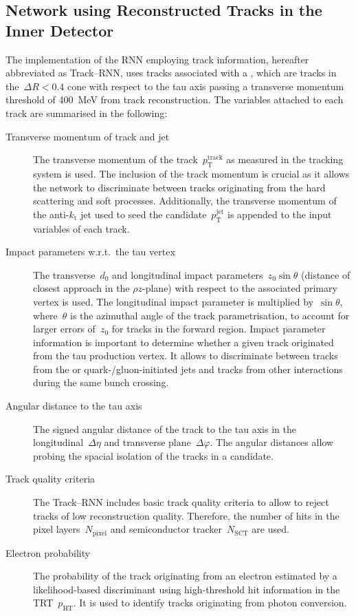 \subsection{Network using Reconstructed Tracks in the Inner Detector}
\label{sec:rnn_tracks}

The implementation of the RNN employing track information, hereafter abbreviated
as Track--RNN, uses tracks associated with a \tauhadvis, which are tracks in
the~$\Delta R < 0.4$ cone with respect to the tau axis passing a transverse
momentum threshold of \SI{400}{\MeV} from track reconstruction. The variables
attached to each track are summarised in the following:
\begin{description}
\item[Transverse momentum of track and jet] The transverse momentum of the
  track~$p_\text{T}^\text{track}$ as measured in the tracking system is used.
  The inclusion of the track momentum is crucial as it allows the network to
  discriminate between tracks originating from the hard scattering and soft
  processes. Additionally, the transverse momentum of the anti-$k_\text{t}$ jet
  used to seed the \tauhadvis candidate~$p_\text{T}^\text{jet}$ is appended to
  the input variables of each track.


\item[Impact parameters w.r.t.\ the tau vertex] The transverse~$d_0$ and
  longitudinal impact parameters~$z_0 \sin\theta$ (distance of closest approach
  in the $\rho z$-plane) with respect to the associated primary vertex is used.
  The longitudinal impact parameter is multiplied by~$\sin\theta$,
  where~$\theta$ is the azimuthal angle of the track parametrisation, to account
  for larger errors of~$z_0$ for tracks in the forward region. Impact parameter
  information is important to determine whether a given track originated from
  the tau production vertex. It allows to discriminate between tracks from the
  \tauhad or quark-/gluon-initiated jets and tracks from other interactions
  during the same bunch crossing.

\item[Angular distance to the tau axis] The signed angular distance of the track
  to the tau axis in the longitudinal~$\Delta \eta$ and transverse
  plane~$\Delta \varphi$. The angular distances allow probing the spacial
  isolation of the tracks in a \tauhadvis candidate.

\item[Track quality criteria] The Track--RNN includes basic track quality
  criteria to allow to reject tracks of low reconstruction quality. Therefore,
  the number of hits in the pixel layers~$N_\text{pixel}$ and semiconductor
  tracker~$N_\text{SCT}$ are used.

\item[Electron probability] The probability of the track originating from an
  electron estimated by a likelihood-based discriminant using high-threshold hit
  information in the TRT~$p_\text{HT}$. It is used to identify tracks
  originating from photon conversion.
\end{description}
